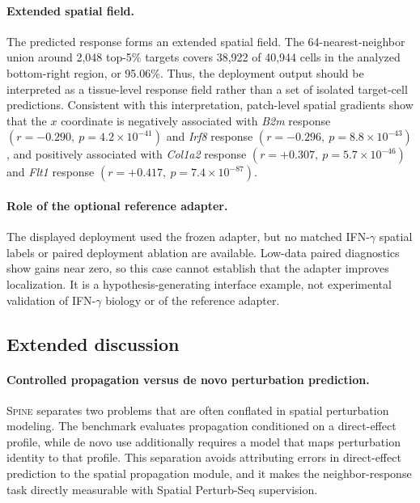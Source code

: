 \documentclass[sigconf,review,balance=false]{acmart}
\newcommand{\methodname}{\textsc{Spine}\xspace}
\begin{document}
\paragraph{Extended spatial field.}
The predicted response forms an extended spatial field. The 64-nearest-neighbor union around 2,048 top-5\% targets covers 38,922 of 40,944 cells in the analyzed bottom-right region, or 95.06\%. Thus, the deployment output should be interpreted as a tissue-level response field rather than a set of isolated target-cell predictions. Consistent with this interpretation, patch-level spatial gradients show that the $x$ coordinate is negatively associated with \textit{B2m} response $(r=-0.290,\ p=4.2\times10^{-41})$ and \textit{Irf8} response $(r=-0.296,\ p=8.8\times10^{-43})$, and positively associated with \textit{Col1a2} response $(r=+0.307,\ p=5.7\times10^{-46})$ and \textit{Flt1} response $(r=+0.417,\ p=7.4\times10^{-87})$.

\paragraph{Role of the optional reference adapter.}
The displayed deployment used the frozen adapter, but no matched
IFN-$\gamma$ spatial labels or paired deployment ablation are available.
Low-data paired diagnostics show gains near zero, so this case cannot establish
that the adapter improves localization. It is a hypothesis-generating
interface example, not experimental validation of IFN-$\gamma$ biology or of
the reference adapter.

\subsection{Extended discussion}
\label{app:extended_discussion}

\paragraph{Controlled propagation versus de novo perturbation prediction.}
\methodname{} separates two problems that are often conflated in spatial perturbation modeling. The benchmark evaluates propagation conditioned on a direct-effect profile, while de novo use additionally requires a model that maps perturbation identity to that profile. This separation avoids attributing errors in direct-effect prediction to the spatial propagation module, and it makes the neighbor-response task directly measurable with Spatial Perturb-Seq supervision.
\end{document}
